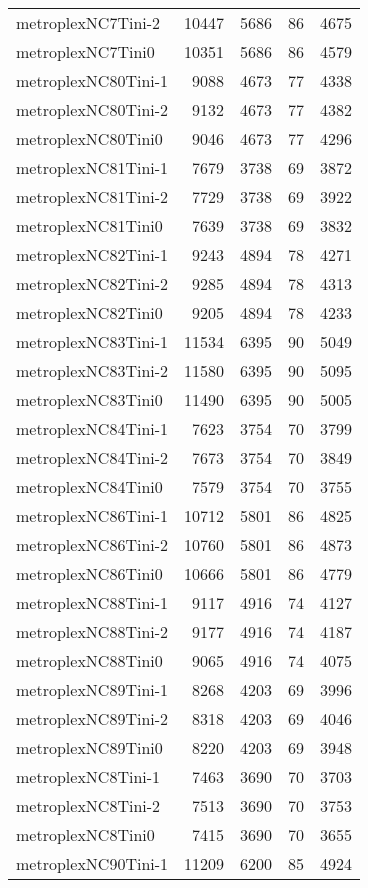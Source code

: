 \begin{longtable}{lrrrr}
metroplexNC7Tini-2 & 10447 & 5686 & 86 & 4675 \\
metroplexNC7Tini0 & 10351 & 5686 & 86 & 4579 \\
metroplexNC80Tini-1 & 9088 & 4673 & 77 & 4338 \\
metroplexNC80Tini-2 & 9132 & 4673 & 77 & 4382 \\
metroplexNC80Tini0 & 9046 & 4673 & 77 & 4296 \\
metroplexNC81Tini-1 & 7679 & 3738 & 69 & 3872 \\
metroplexNC81Tini-2 & 7729 & 3738 & 69 & 3922 \\
metroplexNC81Tini0 & 7639 & 3738 & 69 & 3832 \\
metroplexNC82Tini-1 & 9243 & 4894 & 78 & 4271 \\
metroplexNC82Tini-2 & 9285 & 4894 & 78 & 4313 \\
metroplexNC82Tini0 & 9205 & 4894 & 78 & 4233 \\
metroplexNC83Tini-1 & 11534 & 6395 & 90 & 5049 \\
metroplexNC83Tini-2 & 11580 & 6395 & 90 & 5095 \\
metroplexNC83Tini0 & 11490 & 6395 & 90 & 5005 \\
metroplexNC84Tini-1 & 7623 & 3754 & 70 & 3799 \\
metroplexNC84Tini-2 & 7673 & 3754 & 70 & 3849 \\
metroplexNC84Tini0 & 7579 & 3754 & 70 & 3755 \\
metroplexNC86Tini-1 & 10712 & 5801 & 86 & 4825 \\
metroplexNC86Tini-2 & 10760 & 5801 & 86 & 4873 \\
metroplexNC86Tini0 & 10666 & 5801 & 86 & 4779 \\
metroplexNC88Tini-1 & 9117 & 4916 & 74 & 4127 \\
metroplexNC88Tini-2 & 9177 & 4916 & 74 & 4187 \\
metroplexNC88Tini0 & 9065 & 4916 & 74 & 4075 \\
metroplexNC89Tini-1 & 8268 & 4203 & 69 & 3996 \\
metroplexNC89Tini-2 & 8318 & 4203 & 69 & 4046 \\
metroplexNC89Tini0 & 8220 & 4203 & 69 & 3948 \\
metroplexNC8Tini-1 & 7463 & 3690 & 70 & 3703 \\
metroplexNC8Tini-2 & 7513 & 3690 & 70 & 3753 \\
metroplexNC8Tini0 & 7415 & 3690 & 70 & 3655 \\
metroplexNC90Tini-1 & 11209 & 6200 & 85 & 4924 \\

\end{longtable}
